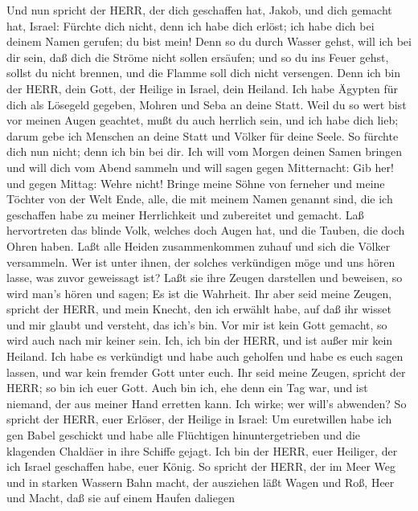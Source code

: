  Und nun spricht der HERR, der dich geschaffen hat, Jakob,
und dich gemacht hat, Israel: Fürchte dich nicht, denn ich habe dich
erlöst; ich habe dich bei deinem Namen gerufen; du bist mein!
 Denn so du durch Wasser gehst, will ich bei dir sein, daß
dich die Ströme nicht sollen ersäufen; und so du ins Feuer gehst, sollst
du nicht brennen, und die Flamme soll dich nicht versengen. 
Denn ich bin der HERR, dein Gott, der Heilige in Israel, dein Heiland.
Ich habe Ägypten für dich als Lösegeld gegeben, Mohren und Seba an deine
Statt.  Weil du so wert bist vor meinen Augen geachtet, mußt
du auch herrlich sein, und ich habe dich lieb; darum gebe ich Menschen
an deine Statt und Völker für deine Seele.  So fürchte dich
nun nicht; denn ich bin bei dir. Ich will vom Morgen deinen Samen
bringen und will dich vom Abend sammeln  und will sagen
gegen Mitternacht: Gib her! und gegen Mittag: Wehre nicht! Bringe meine
Söhne von ferneher und meine Töchter von der Welt Ende, 
alle, die mit meinem Namen genannt sind, die ich geschaffen habe zu
meiner Herrlichkeit und zubereitet und gemacht.  Laß
hervortreten das blinde Volk, welches doch Augen hat, und die Tauben,
die doch Ohren haben.  Laßt alle Heiden zusammenkommen
zuhauf und sich die Völker versammeln. Wer ist unter ihnen, der solches
verkündigen möge und uns hören lasse, was zuvor geweissagt ist? Laßt sie
ihre Zeugen darstellen und beweisen, so wird man's hören und sagen; Es
ist die Wahrheit.  Ihr aber seid meine Zeugen, spricht der
HERR, und mein Knecht, den ich erwählt habe, auf daß ihr wisset und mir
glaubt und versteht, das ich's bin. Vor mir ist kein Gott gemacht, so
wird auch nach mir keiner sein.  Ich, ich bin der HERR, und
ist außer mir kein Heiland.  Ich habe es verkündigt und
habe auch geholfen und habe es euch sagen lassen, und war kein fremder
Gott unter euch. Ihr seid meine Zeugen, spricht der HERR; so bin ich
euer Gott.  Auch bin ich, ehe denn ein Tag war, und ist
niemand, der aus meiner Hand erretten kann. Ich wirke; wer will's
abwenden?  So spricht der HERR, euer Erlöser, der Heilige
in Israel: Um euretwillen habe ich gen Babel geschickt und habe alle
Flüchtigen hinuntergetrieben und die klagenden Chaldäer in ihre Schiffe
gejagt.  Ich bin der HERR, euer Heiliger, der ich Israel
geschaffen habe, euer König.  So spricht der HERR, der im
Meer Weg und in starken Wassern Bahn macht,  der ausziehen
läßt Wagen und Roß, Heer und Macht, daß sie auf einem Haufen daliegen
